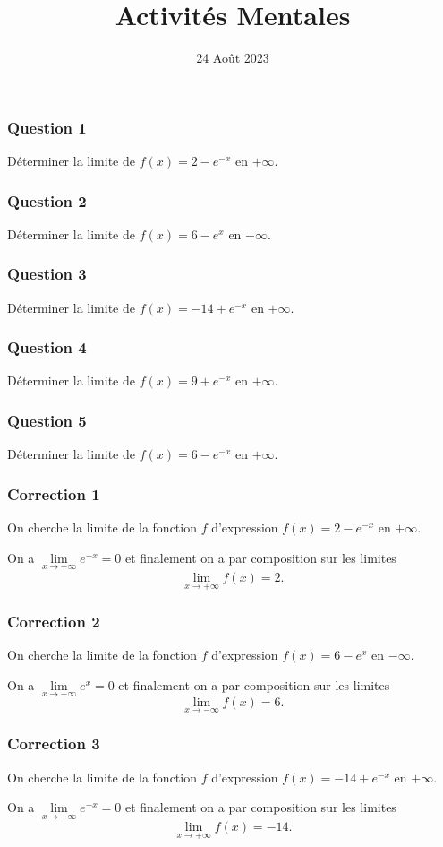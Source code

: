 \documentclass[15pt, mathserif]{beamer}
\title{Activités Mentales}
\date{24 Août 2023}
\begin{document}
\begin{frame}
    \titlepage
\end{frame}

\begin{frame} 
	\frametitle{Question 1}
Déterminer la limite de $f(x) = 2-e^{-x}$ en $+\infty$.\end{frame}


\begin{frame} 
	\frametitle{Question 2}
Déterminer la limite de $f(x) = 6-e^{x}$ en $-\infty$.\end{frame}


\begin{frame} 
	\frametitle{Question 3}
Déterminer la limite de $f(x) = -14+e^{-x}$ en $+\infty$.\end{frame}


\begin{frame} 
	\frametitle{Question 4}
Déterminer la limite de $f(x) = 9+e^{-x}$ en $+\infty$.\end{frame}


\begin{frame} 
	\frametitle{Question 5}
Déterminer la limite de $f(x) = 6-e^{-x}$ en $+\infty$.\end{frame}


\begin{frame}
\vspace{-10mm}
	\frametitle{Correction 1}
On cherche la limite de la fonction $f$ d'expression $f(x) = 2-e^{-x}$ en $+\infty$.

On a $\lim\limits_{x \rightarrow +\infty} e^{-x} = 0$ et finalement on a par composition sur les limites \[\lim\limits_{x \rightarrow +\infty}f(x) = 2.\]
\end{frame}


\begin{frame}
\vspace{-10mm}
	\frametitle{Correction 2}
On cherche la limite de la fonction $f$ d'expression $f(x) = 6-e^{x}$ en $-\infty$.

On a $\lim\limits_{x \rightarrow -\infty} e^{x} = 0$ et finalement on a par composition sur les limites \[\lim\limits_{x \rightarrow -\infty}f(x) = 6.\]
\end{frame}


\begin{frame}
\vspace{-10mm}
	\frametitle{Correction 3}
On cherche la limite de la fonction $f$ d'expression $f(x) = -14+e^{-x}$ en $+\infty$.

On a $\lim\limits_{x \rightarrow +\infty} e^{-x} = 0$ et finalement on a par composition sur les limites \[\lim\limits_{x \rightarrow +\infty}f(x) = -14.\]
\end{frame}
\end{document}
